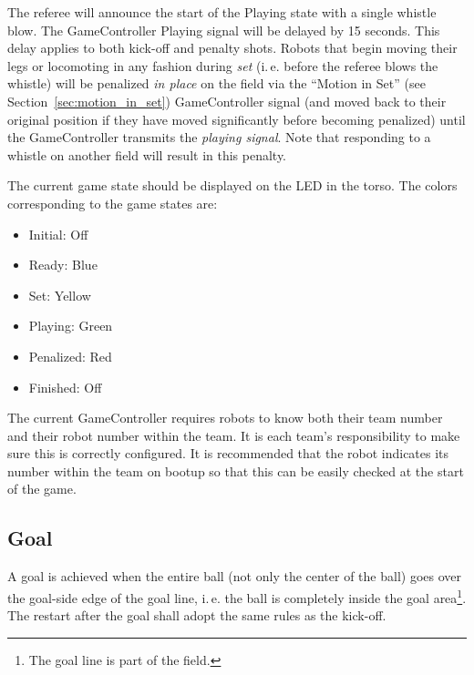 \documentclass[12pt]{article}
\newcommand{\ie}{\mbox{i.\,e.}\xspace}
\newcommand{\cf}{see\xspace}
\newcommand{\PlayingDelayTime}{15 seconds\xspace}
\begin{document}
The referee will announce the start of the Playing state with a single whistle blow.
The GameController Playing signal will be delayed by \PlayingDelayTime.
This delay applies to both kick-off and penalty shots.
Robots that begin moving their legs or locomoting in any fashion during \emph{set} (\ie before the referee blows the whistle) will be penalized \textit{in place} on the field via the ``Motion in Set'' (\cf Section~\ref{sec:motion_in_set}) GameController signal (and moved back to their original position if they have moved significantly before becoming penalized) until the GameController transmits the \emph{playing signal}.
Note that responding to a whistle on another field will result in this penalty.

The current game state should be displayed on the LED in the torso. The colors corresponding to the game states are:

\begin{itemize}

\item Initial: Off

\item Ready: Blue

\item Set: Yellow

\item Playing: Green

\item Penalized: Red

\item Finished: Off

\end{itemize}

The current GameController requires robots to know both their team number and their robot number within the team. It is each team's responsibility to make sure this is correctly configured. It is recommended that the robot indicates its number within the team on bootup so that this can be easily checked at the start of the game.

\subsection{Goal}
\label{sec:goal}
A goal is achieved when the entire ball (not only the center of the ball) goes over the goal-side edge of the goal line, \ie the ball is completely inside the goal area\footnote{The goal line is part of the field.}. The restart after the goal shall adopt the same rules as the kick-off.
\end{document}
